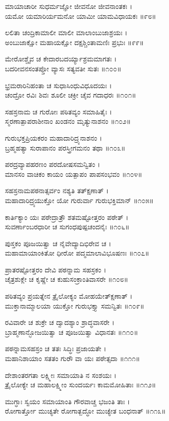 ಮಾಯಾಚಾರೀ ಸುಧರ್ಮಜ್ಞೋ ಜೀವನೋ ಜೀವನಾಂತಕಃ ।\\
ಯಮೋ ಯಮಾರಿರ್ಯಮನೋ ಯಾಮೀ ಯಾಮವಿಧಾಯಕಃ ॥೯೮॥

ಲಲಿತಾ ಚಂದ್ರಿಕಾಮಾಲೀ ಮಾಲೀ ಮಾಲಾಂಬುಜಾಶ್ರಯಃ ।\\
ಅಂಬುಜಾಕ್ಷೋ ಮಹಾಯಕ್ಷೋ ದಕ್ಷಶ್ಚಿಂತಾಮಣಿಃ ಪ್ರಭುಃ ॥೯೯॥

ಮೇರೋಶ್ಚೈವ ಚ ಕೇದಾರಬದರ್ಯ್ಯಾಶ್ರಮಮಾಗತಃ ।\\
ಬದರೀವನಸಂತಪ್ತೋ ವ್ಯಾಸಃ ಸತ್ಯವತೀ ಸುತಃ ॥೧೦೦॥

ಭ್ರಮರಾರಿನಿಹಂತಾ ಚ ಸುಧಾಸಿಂಧುವಿಧೂದಯಃ ।\\
ಚಂದ್ರೋ ರವಿಃ ಶಿವಃ ಶೂಲೀ ಚಕ್ರೀ ಚೈವ ಗದಾಧರಃ ॥೧೦೧॥

ಸಹಸ್ರನಾಮ ಚ ಗುರೋಃ ಪಠಿತವ್ಯಂ ಸಮಾಹಿತೈಃ ।\\
ಸ್ಮರಣಾತ್ಪಾಪರಾಶೀನಾಂ ಖಂಡನಂ ಮೃತ್ಯುನಾಶನಂ ॥೧೦೨॥

ಗುರುಭಕ್ತಪ್ರಿಯಕರಂ ಮಹಾದಾರಿದ್ರ್ಯನಾಶನಂ ।\\
ಬ್ರಹ್ಮಹತ್ಯಾ ಸುರಾಪಾನಂ ಪರಸ್ತ್ರೀಗಮನಂ ತಥಾ ॥೧೦೩॥

ಪರದ್ರವ್ಯಾಪಹರಣಂ ಪರದೋಷಸಮನ್ವಿತಂ ।\\
ಮಾನಸಂ ವಾಚಿಕಂ ಕಾಯಂ ಯತ್ಪಾಪಂ ಪಾಪಸಂಭವಂ ॥೧೦೪॥

ಸಹಸ್ರನಾಮಪಠನಾತ್ಸರ್ವಂ ನಶ್ಯತಿ ತತ್ಕ್ಷಣಾತ್ ।\\
ಮಹಾದಾರಿದ್ರ್ಯಯುಕ್ತೋ ಯೋ ಗುರುರ್ವಾ ಗುರುಭಕ್ತಿಮಾನ್ ॥೧೦೫॥

ಕಾರ್ತಿಕ್ಯಾಂ ಯಃ ಪಠೇದ್ರಾತ್ರೌ ಶತಮಷ್ಟೋತ್ತರಂ ಪಠೇತ್ ।\\
ಸುವರ್ಣಾಂಬರಧಾರೀ ಚ ಸುಗಂಧಪುಷ್ಪಚಂದನೈಃ ॥೧೦೬॥

ಪುಸ್ತಕಂ ಪೂಜಯಿತ್ವಾ ಚ ನೈವೇದ್ಯಾದಿಭಿರೇವ ಚ ।\\
ಮಹಾಮಾಯಾಂಕಿತೋ ಧೀರೋ ಪದ್ಮಮಾಲಾವಿಭೂಷಣಃ ॥೧೦೭॥

ಪ್ರಾತರಷ್ಟೋತ್ತರಂ ದೇವಿ ಪಠನ್ನಾಮ ಸಹಸ್ರಕಂ ।\\
ಚೈತ್ರಶುಕ್ಲೇ ಚ ಕೃಷ್ಣೇ ಚ ಕುಹುಸಂಕ್ರಾಂತಿವಾಸರೇ ॥೧೦೮॥

ಪಠಿತವ್ಯಂ ಪ್ರಯತ್ನೇನ ತ್ರೈಲೋಕ್ಯಂ ಮೋಹಯೇತ್ಕ್ಷಣಾತ್ ।\\
ಮುಕ್ತಾನಾಮ್ಮಾಲಯಾ ಯುಕ್ತೋ ಗುರುಭಕ್ತ್ಯಾ ಸಮನ್ವಿತಃ ॥೧೦೯॥

ರವಿವಾರೇ ಚ ಶುಕ್ರೇ ಚ ದ್ವಾದಶ್ಯಾಂ ಶ್ರಾದ್ಧವಾಸರೇ ।\\
ಬ್ರಾಹ್ಮಣಾನ್ಭೋಜಯಿತ್ವಾ ಚ ಪೂಜಯಿತ್ವಾ ವಿಧಾನತಃ ॥೧೧೦॥

ಪಠನ್ನಾಮಸಹಸ್ರಂ ಚ ತತಃ ಸಿದ್ಧಿಃ ಪ್ರಜಾಯತೇ ।\\
ಮಹಾನಿಶಾಯಾಂ ಸತತಂ ಗುರೌ ವಾ ಯಃ ಪಠೇತ್ಸದಾ ॥೧೧೧॥

ದೇಶಾಂತರಗತಾ ಲಕ್ಷ್ಮೀಃ ಸಮಾಯಾತಿ ನ ಸಂಶಯಃ ।\\
ತ್ರೈಲೋಕ್ಯೇ ಚ ಮಹಾಲಕ್ಷ್ಮೀಂ ಸುಂದರ್ಯಃ ಕಾಮಮೋಹಿತಾಃ ॥೧೧೨॥

ಮುಗ್ಧಾಃ ಸ್ವಯಂ ಸಮಾಯಾಂತಿ ಗೌರವಾಚ್ಚ ಭಜಂತಿ ತಾಃ ।\\
ರೋಗಾರ್ತ್ತೋ ಮುಚ್ಯತೇ ರೋಗಾತ್ಬದ್ಧೋ ಮುಚ್ಯೇತ ಬಂಧನಾತ್ ॥೧೧೩॥

